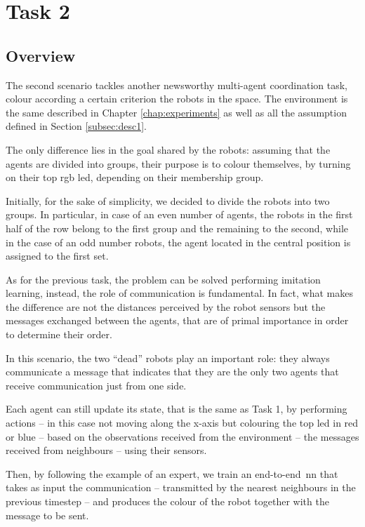 \section{Task 2}
\label{sec:task2}

\subsection{Overview}
\label{subsec:desc2}

The second scenario tackles another newsworthy multi-agent coordination 
task, 
colour according a certain criterion the robots in the space. 
The environment is the same described in Chapter \ref{chap:experiments} as 
well as all the assumption defined in Section \ref{subsec:desc1}.

The only difference lies in the goal shared by the robots: assuming that the agents 
are divided into groups, their purpose is to colour themselves, by turning on their 
top \gls{rgb} \gls{led}, depending on their membership group.

Initially, for the sake of simplicity, we decided to divide the robots into two 
groups. In particular, in case of an even number of agents, the robots in the first 
half of the row belong to the first group and the remaining to the second, while in 
the case of an odd number robots, the agent located in the central position is 
assigned to the first set.

As for the previous task, the problem can be solved performing imitation 
learning, instead, the role of communication is fundamental. In fact, what 
makes the difference are not the distances perceived by the robot sensors but the 
messages exchanged between the agents, that are of primal importance in order 
to determine their order. 

In this scenario, the two ``dead'' robots play an important role: they always 
communicate a message that indicates that they are the only two agents that 
receive communication just from one side.

Each agent can still update its state, that is the same as Task 1, by performing 
actions – in this case not moving along the x-axis but colouring the top \gls{led} 
in red or blue – based on the observations received from the environment – the 
messages received from neighbours – using their sensors. 

Then, by following the example of an expert, we train an end-to-end \gls{nn} 
that takes as input the communication – transmitted by the nearest neighbours in 
the previous timestep – and produces the colour of the robot together with the 
message to be sent.

